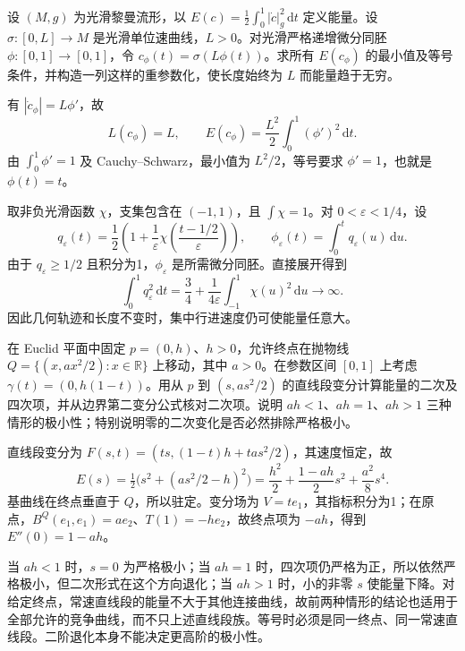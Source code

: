 \begin{exercise}\label{g3:ex:energy-reparametrization-unbounded}
	设 \((M,g)\) 为光滑黎曼流形，以 \(E(c)=\tfrac12\int_0^1|\dot c|_g^2\,\mathrm dt\) 定义能量。设 \(\sigma:[0,L]\to M\) 是光滑单位速曲线，\(L>0\)。对光滑严格递增微分同胚 \(\phi:[0,1]\to[0,1]\)，令 \(c_\phi(t)=\sigma(L\phi(t))\)。求所有 \(E(c_\phi)\) 的最小值及等号条件，并构造一列这样的重参数化，使长度始终为 \(L\) 而能量趋于无穷。
\end{exercise}
\begin{solution}
	有 \(|\dot c_\phi|=L\phi'\)，故
	\[
		L(c_\phi)=L,\qquad E(c_\phi)=\frac{L^2}{2}\int_0^1(\phi')^2\,\mathrm dt.
	\]
	由 \(\int_0^1\phi'=1\) 及 Cauchy--Schwarz，最小值为 \(L^2/2\)，等号要求 \(\phi'=1\)，也就是 \(\phi(t)=t\)。

	取非负光滑函数 \(\chi\)，支集包含在 \((-1,1)\)，且 \(\int\chi=1\)。对 \(0<\varepsilon<1/4\)，设
	\[
		q_\varepsilon(t)=\frac12\left(1+\frac1\varepsilon\chi\left(\frac{t-1/2}{\varepsilon}\right)\right),
		\qquad \phi_\varepsilon(t)=\int_0^t q_\varepsilon(u)\,\mathrm du.
	\]
	由于 \(q_\varepsilon\ge1/2\) 且积分为1，\(\phi_\varepsilon\) 是所需微分同胚。直接展开得到
	\[
		\int_0^1q_\varepsilon^2\,\mathrm dt
		=\frac34+\frac1{4\varepsilon}\int_{-1}^1\chi(u)^2\,\mathrm du\longrightarrow\infty.
	\]
	因此几何轨迹和长度不变时，集中行进速度仍可使能量任意大。
\end{solution}

\begin{exercise}\label{g3:ex:parabola-endpoint-degenerate-minimum}
	在 Euclid 平面中固定 \(p=(0,h)\)、\(h>0\)，允许终点在抛物线 \(Q=\{(x,ax^2/2):x\in\mathbb R\}\) 上移动，其中 \(a>0\)。在参数区间 \([0,1]\) 上考虑 \(\gamma(t)=(0,h(1-t))\)。用从 \(p\) 到 \((s,as^2/2)\) 的直线段变分计算能量的二次及四次项，并从边界第二变分公式核对二次项。说明 \(ah<1\)、\(ah=1\)、\(ah>1\) 三种情形的极小性；特别说明零的二次变化是否必然排除严格极小。
\end{exercise}
\begin{solution}
	直线段变分为 \(F(s,t)=(ts,(1-t)h+tas^2/2)\)，其速度恒定，故
	\[
		E(s)=\tfrac12\bigl(s^2+(as^2/2-h)^2\bigr)
		=\frac{h^2}{2}+\frac{1-ah}{2}s^2+\frac{a^2}{8}s^4.
	\]
	基曲线在终点垂直于 \(Q\)，所以驻定。变分场为 \(V=te_1\)，其指标积分为1；在原点，\(B^Q(e_1,e_1)=ae_2\)、\(T(1)=-he_2\)，故终点项为 \(-ah\)，得到 \(E''(0)=1-ah\)。

	当 \(ah<1\) 时，\(s=0\) 为严格极小；当 \(ah=1\) 时，四次项仍严格为正，所以依然严格极小，但二次形式在这个方向退化；当 \(ah>1\) 时，小的非零 \(s\) 使能量下降。对给定终点，常速直线段的能量不大于其他连接曲线，故前两种情形的结论也适用于全部允许的竞争曲线，而不只上述直线段族。等号时必须是同一终点、同一常速直线段。二阶退化本身不能决定更高阶的极小性。
\end{solution}

